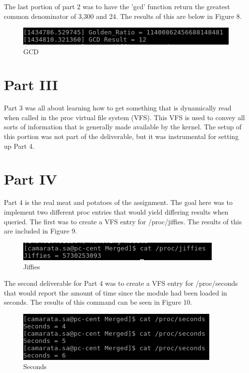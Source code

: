 \documentclass[10pt]{article}
\begin{document}
The last portion of part 2 was to have the 'gcd' function return the greatest common denominator of 3,300 and 24.  The results of this are below in Figure 8.

\begin{figure}[!h]
\centering
\includegraphics[scale=0.5]{./images/ss8.png}
\caption{GCD}
\label{fig:Code}
\end{figure}

\pagebreak
\section{Part III}
Part 3 was all about learning how to get something that is dynamically read when called in the proc virtual file system (VFS).  This VFS is used to convey all sorts of information that is generally made available by the kernel.  The setup of this portion was not part of the deliverable, but it was instrumental for setting up Part 4.

\section{Part IV}
Part 4 is the real meat and potatoes of the assignment.  The goal here was to implement two different proc entries that would yield differing results when queried.  The first was to create a VFS entry for /proc/jiffies.  The results of this are included in Figure 9.

\begin{figure}[!h]
\centering
\includegraphics[scale=0.5]{./images/ss9.png}
\caption{Jiffies}
\label{fig:Code}
\end{figure}

The second deliverable for Part 4 was to create a VFS entry for /proc/seconds that would report the amount of time since the module had been loaded in seconds.  The results of this command can be seen in Figure 10.

\begin{figure}[!h]
\centering
\includegraphics[scale=0.5]{./images/ss10.png}
\caption{Seconds}
\label{fig:Code}
\end{figure}
\end{document}
